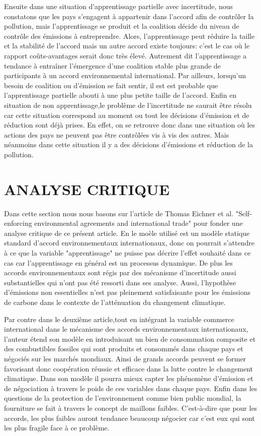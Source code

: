 \documentclass[12pt]{article}
\begin{document}
\newline Ensuite dans une situation d'apprentissage partielle avec incertitude, nous constatons que les pays s'engagent à appartenir dans l'accord afin de contrôler la pollution, mais l'apprentissage se produit et la coalition décide du niveau de contrôle des émissions à entreprendre. Alors, l'apprentissage peut réduire la taille et la stabilité de l'accord mais un autre accord existe toujours: c'est le cas où le rapport coûts-avantages serait donc très élevé. Autrement dit l'apprentissage a tendance à entraîner l'émergence d'une coalition stable plus grande de participants à un accord environnemental international. Par ailleurs, lorsqu'un besoin de coalition ou d'émission se fait sentir, il est est probable que l'apprentissage partielle abouti à une plus petite taille de l'accord.
\newline Enfin en situation de non apprentissage,le problème de l'incertitude ne saurait être résolu car cette situation correspond au moment ou tout les décisions d'émission et de réduction sont déjà prises. En effet, on se retrouve donc dans une situation où les actions des pays ne peuvent pas être contrôlées vis à vis des autres. Mais  néanmoins dans cette situation il y a des décisions d'émissions et réduction de la pollution.
\section{ANALYSE CRITIQUE}
Dans cette section nous nous basons sur l'article de Thomas Eichner et al. "Self-enforcing environmental agreements and international trade" pour fonder une analyse critique de ce présent article. En le moèle utilisé est un modèle statique standard d'accord environnementaux internationaux, donc on pourrait s'attendre à ce que la variable "apprentissage" ne puisse pas décrire l'effet souhaité dans ce cas car l'apprentissage en général est un processus dynamique. De plus les accords environnementaux sont régis par des mécanisme d'incertitude aussi substantielles qui n'ont pas été ressorti dans ses analyse. Aussi, l'hypothèse d'émissions non essentielles n'est pas pleinement satisfaisante pour les émissions de carbone dans le contexte de l'atténuation du changement climatique. 
\par Par contre dans le deuxième article,tout en intégrant la variable commerce international dans le mécanisme des accords environnementaux internationaux, l'auteur étend son modèle en introduisant un bien de consommation composite et des combustibles fossiles qui sont produits et consommés dans chaque pays et négociés sur les marchés mondiaux. Ainsi de grands accords peuvent se former favorisant donc  coopération réussie et efficace dans la lutte contre le changement climatique. Dans son modèle il pourra mieux capter les phénomène d'émission et de négociation à travers le poids de ces variables dans chaque pays.
\newline Enfin dans les questions de la protection de l'environnement comme bien public mondial, la fourniture se fait à travers le concept de maillons faibles. C'est-à-dire que pour les accords, les plus faibles auront tendance beaucoup négocier car c'est eux qui sont les plus fragile face à ce problème.
\end{document}
